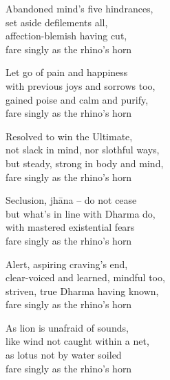 \begin{MyDescription}{}  	
Abandoned mind's five hindrances,\\
set aside defilements all,\\
affection-blemish having cut,\\
fare singly as the rhino's horn
\end{MyDescription}

\begin{MyDescription}{}  	
Let go of pain and happiness\\
with previous joys and sorrows too,\\
gained poise and calm and purify,\\
fare singly as the rhino's horn
\end{MyDescription}
  
\begin{MyDescription}{}  	
Resolved to win the Ultimate,\\
not slack in mind, nor slothful ways,\\
but steady, strong in body and mind,\\
fare singly as the rhino's horn\\
\end{MyDescription}
   
\begin{MyDescription}{}  	
Seclusion, jh\=ana – do not cease\\
but what's in line with Dharma do,\\
with mastered existential fears\\
fare singly as the rhino's horn
\end{MyDescription}
   
\begin{MyDescription}{}  	
Alert, aspiring craving's end,\\
clear-voiced and learned, mindful too,\\
striven, true Dharma having known,\\
fare singly as the rhino's horn
\end{MyDescription}
   
\begin{MyDescription}{}  	
As lion is unafraid of sounds,\\
like wind not caught within a net,\\
as lotus not by water soiled\\
fare singly as the rhino's horn
\end{MyDescription}
      
